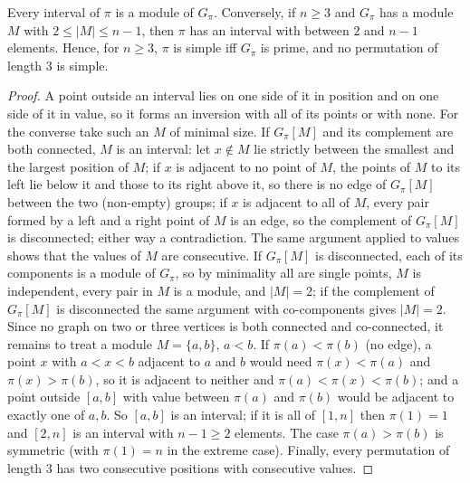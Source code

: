 \begin{lemma}\label{lem:simpleprime}
Every interval of $\pi$ is a module of $G_\pi$. Conversely, if $n\ge3$ and $G_\pi$ has a module $M$ with $2\le|M|\le n-1$, then $\pi$ has an interval with between $2$ and $n-1$ elements. Hence, for $n\ge3$, $\pi$ is simple iff $G_\pi$ is prime, and no permutation of length $3$ is simple. 
\end{lemma}
\begin{proof}
A point outside an interval lies on one side of it in position and on one side of it in value, so it forms an inversion with all of its points or with none. For the converse take such an $M$ of minimal size. If $G_\pi[M]$ and its complement are both connected, $M$ is an interval: let $x\notin M$ lie strictly between the smallest and the largest position of $M$; if $x$ is adjacent to no point of $M$, the points of $M$ to its left lie below it and those to its right above it, so there is no edge of $G_\pi[M]$ between the two (non-empty) groups; if $x$ is adjacent to all of $M$, every pair formed by a left and a right point of $M$ is an edge, so the complement of $G_\pi[M]$ is disconnected; either way a contradiction. The same argument applied to values shows that the values of $M$ are consecutive. If $G_\pi[M]$ is disconnected, each of its components is a module of $G_\pi$, so by minimality all are single points, $M$ is independent, every pair in $M$ is a module, and $|M|=2$; if the complement of $G_\pi[M]$ is disconnected the same argument with co-components gives $|M|=2$. Since no graph on two or three vertices is both connected and co-connected, it remains to treat a module $M=\{a,b\}$, $a<b$. If $\pi(a)<\pi(b)$ (no edge), a point $x$ with $a<x<b$ adjacent to $a$ and $b$ would need $\pi(x)<\pi(a)$ and $\pi(x)>\pi(b)$, so it is adjacent to neither and $\pi(a)<\pi(x)<\pi(b)$; and a point outside $[a,b]$ with value between $\pi(a)$ and $\pi(b)$ would be adjacent to exactly one of $a,b$. So $[a,b]$ is an interval; if it is all of $[1,n]$ then $\pi(1)=1$ and $[2,n]$ is an interval with $n-1\ge2$ elements. The case $\pi(a)>\pi(b)$ is symmetric (with $\pi(1)=n$ in the extreme case). Finally, every permutation of length $3$ has two consecutive positions with consecutive values.
\end{proof}

